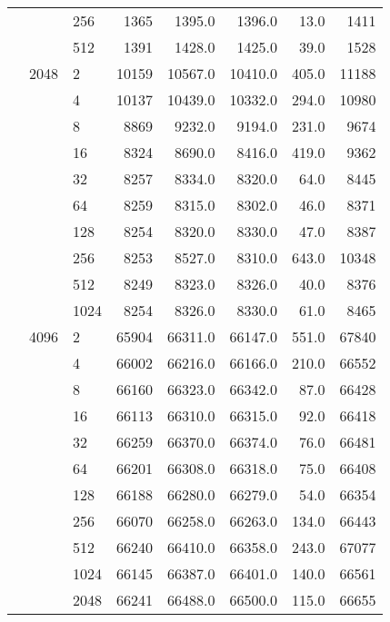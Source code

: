 \begin{tabular}{lllrrrrr}
           &      & 256 &                 1365 &    1395.0 &    1396.0 &     13.0 &    1411 \\
           &      & 512 &                 1391 &    1428.0 &    1425.0 &     39.0 &    1528 \\
           & 2048 & 2 &                10159 &   10567.0 &   10410.0 &    405.0 &   11188 \\
           &      & 4 &                10137 &   10439.0 &   10332.0 &    294.0 &   10980 \\
           &      & 8 &                 8869 &    9232.0 &    9194.0 &    231.0 &    9674 \\
           &      & 16 &                 8324 &    8690.0 &    8416.0 &    419.0 &    9362 \\
           &      & 32 &                 8257 &    8334.0 &    8320.0 &     64.0 &    8445 \\
           &      & 64 &                 8259 &    8315.0 &    8302.0 &     46.0 &    8371 \\
           &      & 128 &                 8254 &    8320.0 &    8330.0 &     47.0 &    8387 \\
           &      & 256 &                 8253 &    8527.0 &    8310.0 &    643.0 &   10348 \\
           &      & 512 &                 8249 &    8323.0 &    8326.0 &     40.0 &    8376 \\
           &      & 1024 &                 8254 &    8326.0 &    8330.0 &     61.0 &    8465 \\
           & 4096 & 2 &                65904 &   66311.0 &   66147.0 &    551.0 &   67840 \\
           &      & 4 &                66002 &   66216.0 &   66166.0 &    210.0 &   66552 \\
           &      & 8 &                66160 &   66323.0 &   66342.0 &     87.0 &   66428 \\
           &      & 16 &                66113 &   66310.0 &   66315.0 &     92.0 &   66418 \\
           &      & 32 &                66259 &   66370.0 &   66374.0 &     76.0 &   66481 \\
           &      & 64 &                66201 &   66308.0 &   66318.0 &     75.0 &   66408 \\
           &      & 128 &                66188 &   66280.0 &   66279.0 &     54.0 &   66354 \\
           &      & 256 &                66070 &   66258.0 &   66263.0 &    134.0 &   66443 \\
           &      & 512 &                66240 &   66410.0 &   66358.0 &    243.0 &   67077 \\
           &      & 1024 &                66145 &   66387.0 &   66401.0 &    140.0 &   66561 \\
           &      & 2048 &                66241 &   66488.0 &   66500.0 &    115.0 &   66655 \\
\bottomrule
\end{tabular}
